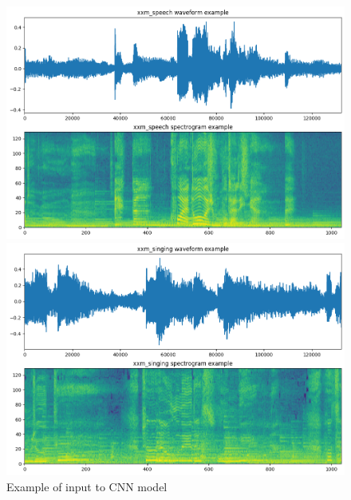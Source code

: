 \documentclass{article}
\begin{document}
    \begin{figure}[H]
        \begin{minipage}{0.49\linewidth}
            \includegraphics[width=\linewidth]{figures/spect_speech.png}
        \end{minipage}
        \begin{minipage}{0.49\linewidth}
            \includegraphics[width=\linewidth]{figures/spect_singing.png}
        \end{minipage}
        \caption{Example of input to CNN model}
        \label{cnn_input_data}
    \end{figure}
\end{document}
